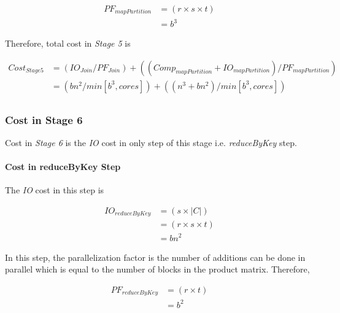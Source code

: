 \begin{equation}
    \begin{aligned}
        PF_{mapPartition}&=(r\times s\times t) \\
        &=b^{3}
    \end{aligned}
\end{equation}

Therefore, total cost in \textit{Stage 5} is

\begin{equation}
    \begin{aligned}
        Cost_{Stage 5}&=(IO_{Join}/PF_{Join})+((Comp_{mapPartition}+IO_{mapPartition})/PF_{mapPartition}) \\
        &=(bn^{2}/min[b^{3}, cores])+((n^{3}+bn^{2})/min[b^{3}, cores]) \\
    \end{aligned}
\end{equation}

\subsubsection{Cost in Stage 6}
Cost in \textit{Stage 6} is the \textit{IO} cost in only step of this stage i.e. \textit{reduceByKey} step.

\paragraph{Cost in reduceByKey Step}
The \textit{IO} cost in this step is

\begin{equation}
    \begin{aligned}
        IO_{reduceByKey}&=(s\times \left | C \right |) \\
        &=(r\times s\times t) \\
        &=bn^{2}
    \end{aligned}
\end{equation}

In this step, the parallelization factor is the number of additions can be done in parallel which is equal to the number of blocks in the product matrix. Therefore,

\begin{equation}
    \begin{aligned}
        PF_{reduceByKey}&=(r\times t) \\
        &=b^{2}
    \end{aligned}
\end{equation}

